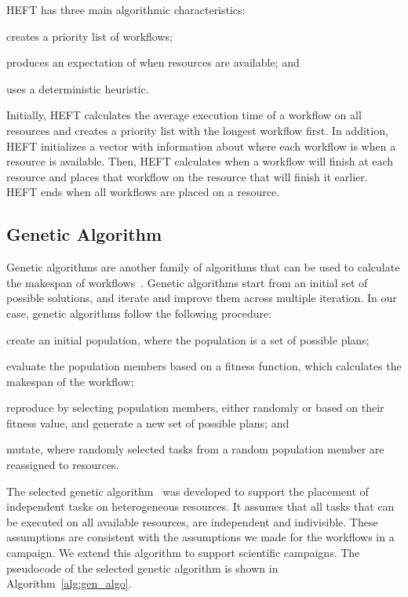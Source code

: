 HEFT has three main algorithmic characteristics:
\begin{inparaenum}[(1)]
    \item creates a priority list of workflows;
    \item produces an expectation of when resources are available; and
    \item uses a deterministic heuristic.
\end{inparaenum}
Initially, HEFT calculates the average execution time of a workflow on all
resources and creates a priority list with the longest workflow first. In
addition, HEFT initializes a vector with information about where each workflow
is when a resource is available. Then, HEFT calculates when a workflow will
finish at each resource and places that workflow on the resource that will finish
it earlier. HEFT ends when all workflows are placed on a resource.


\subsection{Genetic Algorithm}
\label{algo:gen}

Genetic algorithms are another family of algorithms that can be  used to
calculate the makespan of workflows~\cite{dong2006scheduling}. Genetic
algorithms start from an initial set of possible solutions, and iterate and
improve them across multiple iteration. In our case, genetic algorithms follow
the following procedure:
\begin{inparaenum}[(i)]
    \item create an initial population, where the population is a set of
    possible plans;
    \item evaluate the population members based on a fitness function, which
    calculates the makespan of the workflow;
    \item reproduce by selecting population members, either randomly or based
    on their fitness value, and generate a new set of possible plans; and
    \item mutate, where randomly selected tasks from a random population
    member are reassigned to resources.
\end{inparaenum}

The selected genetic algorithm~\cite{page2005algorithm} was developed to support
the placement of independent tasks on heterogeneous resources. It assumes that
all tasks that can be executed on all available resources, are independent and
indivisible. These assumptions are consistent with the assumptions we made for
the workflows in a campaign. We extend this algorithm to support scientific
campaigns. The pseudocode of the selected genetic algorithm is shown in
Algorithm~\ref{alg:gen_algo}.

